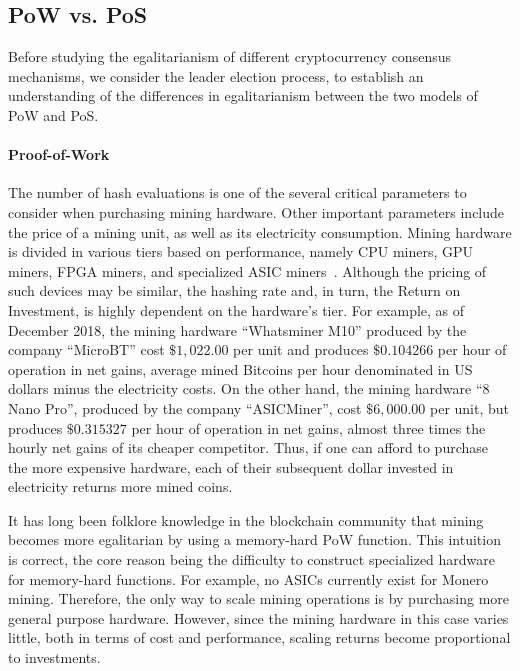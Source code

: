 \subsection{PoW vs. PoS}

Before studying the egalitarianism of different cryptocurrency consensus
mechanisms, we consider the leader election process, to establish an
understanding of the differences in egalitarianism between the two models of
PoW and PoS.

\paragraph{Proof-of-Work}
The number of hash evaluations is one of the several critical parameters to
consider when purchasing mining hardware. Other important parameters include
the price of a mining unit, as well as its electricity consumption. Mining
hardware is divided in various tiers based on performance, namely CPU miners,
GPU miners, FPGA miners, and specialized ASIC miners~\cite{taylor2013bitcoin}.
Although the pricing of such devices may be similar, the hashing rate and, in
turn, the Return on Investment, is highly dependent on the hardware's tier.
For example, as of December 2018, the mining hardware ``Whatsminer M10''
produced by the company ``MicroBT'' cost $\$1{,}022.00$ per unit and produces
$\$0.104266$ per hour of operation in net gains, \ie average mined Bitcoins per
hour denominated in US dollars minus the electricity costs. On the other hand,
the mining hardware ``8 Nano Pro'', produced by the company ``ASICMiner'', cost
$\$6{,}000.00$ per unit, but produces $\$0.315327$ per hour of operation in net
gains, \ie almost three times the hourly net gains of its cheaper competitor.
Thus, if one can afford to purchase the more expensive hardware, each of their
subsequent dollar invested in electricity returns more mined coins.

It has long been folklore knowledge in the blockchain community that mining
becomes more egalitarian by using a memory-hard PoW function. This intuition is
correct, the core reason being the difficulty to construct specialized hardware
for memory-hard functions. For example, no ASICs currently exist for Monero
mining. Therefore, the only way to scale mining operations is by purchasing
more general purpose hardware. However, since the mining hardware in this case
varies little, both in terms of cost and performance, scaling returns become
proportional to investments.


